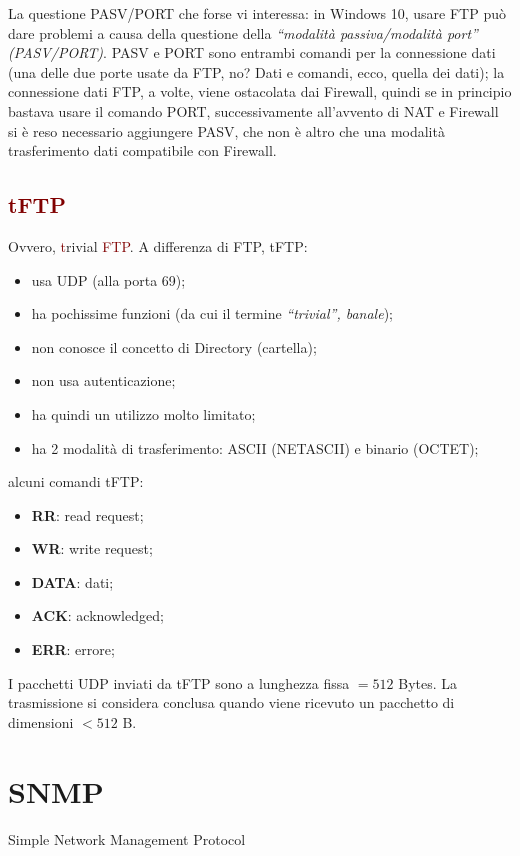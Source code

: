 \noindent La questione PASV/PORT che forse vi interessa: in Windows 10, usare FTP può dare problemi a causa della questione della \textit{``modalità passiva/modalità port'' (PASV/PORT)}. PASV e PORT sono entrambi comandi per la connessione dati (una delle due porte usate da FTP, no? Dati e comandi, ecco, quella dei dati); la connessione dati FTP, a volte, viene ostacolata dai Firewall, quindi se in principio bastava usare il comando PORT, successivamente all'avvento di NAT e Firewall si è reso necessario aggiungere PASV, che non è altro che una modalità trasferimento dati compatibile con Firewall.

\subsection*{\textcolor{Maroon}{tFTP}}
\noindent Ovvero, \textcolor{Maroon}{t}rivial \textcolor{Maroon}{FTP}. A differenza di FTP, tFTP:
\begin{itemize}
    \item usa UDP (alla porta 69);
    \item ha pochissime funzioni (da cui il termine \textit{``trivial'', banale});
    \item non conosce il concetto di Directory (cartella);
    \item non usa autenticazione;
    \item ha quindi un utilizzo molto limitato;
    \item ha 2 modalità di trasferimento: ASCII (NETASCII) e binario (OCTET);
\end{itemize}

\noindent alcuni comandi tFTP:

\begin{itemize}
    \item \textbf{RR}: read request;
    \item \textbf{WR}: write request;
    \item \textbf{DATA}: dati;
    \item \textbf{ACK}: acknowledged;
    \item \textbf{ERR}: errore;
\end{itemize}

\noindent I pacchetti UDP inviati da tFTP sono a lunghezza fissa $= 512$ Bytes. La trasmissione si considera conclusa quando viene ricevuto un pacchetto di dimensioni $< 512$ B.

\section*{\textcolor{WildStrawberry}{SNMP}}
\noindent \textcolor{WildStrawberry}{S}imple \textcolor{WildStrawberry}{N}etwork \textcolor{WildStrawberry}{M}anagement \textcolor{WildStrawberry}{P}rotocol\\

